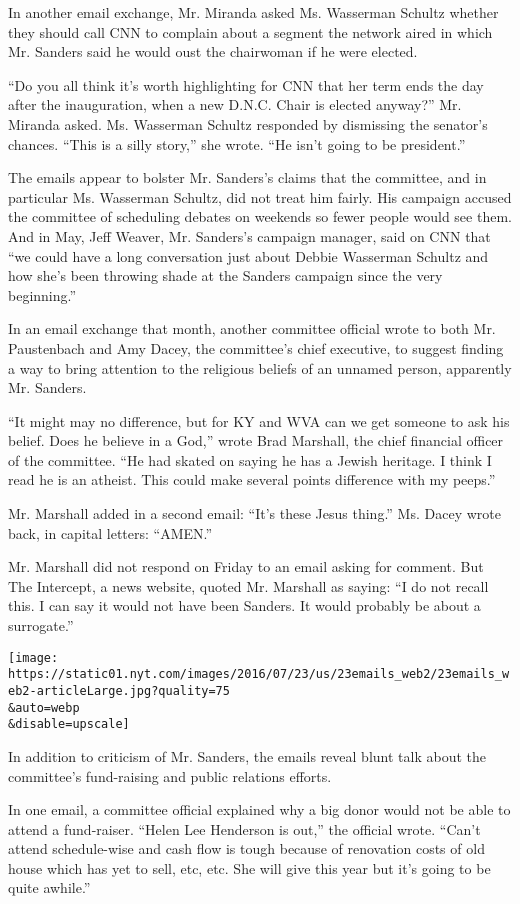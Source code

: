 In another email exchange, Mr. Miranda asked Ms. Wasserman Schultz
whether they should call CNN to complain about a segment the network
aired in which Mr. Sanders said he would oust the chairwoman if he were
elected.

``Do you all think it's worth highlighting for CNN that her term ends
the day after the inauguration, when a new D.N.C. Chair is elected
anyway?'' Mr. Miranda asked. Ms. Wasserman Schultz responded by
dismissing the senator's chances. ``This is a silly story,'' she wrote.
``He isn't going to be president.''

The emails appear to bolster Mr. Sanders's claims that the committee,
and in particular Ms. Wasserman Schultz, did not treat him fairly. His
campaign accused the committee of scheduling debates on weekends so
fewer people would see them. And in May, Jeff Weaver, Mr. Sanders's
campaign manager, said on CNN that ``we could have a long conversation
just about Debbie Wasserman Schultz and how she's been throwing shade at
the Sanders campaign since the very beginning.''

In an email exchange that month, another committee official wrote to
both Mr. Paustenbach and Amy Dacey, the committee's chief executive, to
suggest finding a way to bring attention to the religious beliefs of an
unnamed person, apparently Mr. Sanders.

``It might may no difference, but for KY and WVA can we get someone to
ask his belief. Does he believe in a God,'' wrote Brad Marshall, the
chief financial officer of the committee. ``He had skated on saying he
has a Jewish heritage. I think I read he is an atheist. This could make
several points difference with my peeps.''

Mr. Marshall added in a second email: ``It's these Jesus thing.'' Ms.
Dacey wrote back, in capital letters: ``AMEN.''

Mr. Marshall did not respond on Friday to an email asking for comment.
But The Intercept, a news website, quoted Mr. Marshall as saying: ``I do
not recall this. I can say it would not have been Sanders. It would
probably be about a surrogate.''

\texttt{[image: https://static01.nyt.com/images/2016/07/23/us/23emails\_web2/23emails\_web2-articleLarge.jpg?quality=75\\\&auto=webp\\\&disable=upscale]}

In addition to criticism of Mr. Sanders, the emails reveal blunt talk
about the committee's fund-raising and public relations efforts.

In one email, a committee official explained why a big donor would not
be able to attend a fund-raiser. ``Helen Lee Henderson is out,'' the
official wrote. ``Can't attend schedule-wise and cash flow is tough
because of renovation costs of old house which has yet to sell, etc,
etc. She will give this year but it's going to be quite awhile.''

